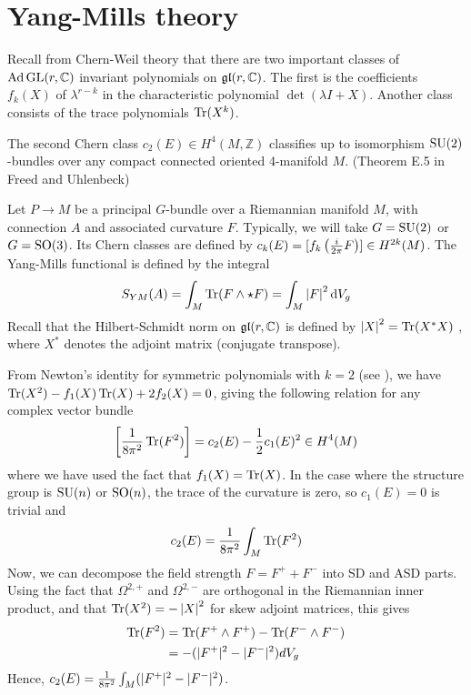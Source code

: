 \section{Yang-Mills theory}
Recall from Chern-Weil theory that there are two important classes of
$\operatorname{Ad} \operatorname{GL}(r,\mathbb{C})$ invariant polynomials on $\operatorname{\mathfrak{gl}}(r,\mathbb{C})$. 
The first is the coefficients $f_k(X)$ of $\lambda^{r-k}$ in the characteristic
polynomial $\det(\lambda I + X)$. Another class consists of the trace
polynomials $\operatorname{Tr}(X^k)$. 
\begin{thm}
	The second Chern class $c_2(E)\in H^4(M,\mathbb{Z})$ classifies up to
	isomorphism $\operatorname{SU}(2)$-bundles over any compact connected oriented 4-manifold
	 $M$. (Theorem E.5 in Freed and Uhlenbeck)
\end{thm}

Let $P\to M$ be a principal $G$-bundle over a Riemannian manifold $M$, with 
connection $A$ and associated curvature  $F$. Typically, we will take $G=\operatorname{SU}(2)$
or $G=\operatorname{SO}(3)$.
Its Chern classes are defined by $c_k(E) =
[f_k\paren{\frac{i}{2\pi}F}] \in H^{2k}(M)$. 
The Yang-Mills functional is defined by the integral
\[
	S_{YM}(A) = \int_M \Tr (F\wedge \star F) = \int_M \abs{F}^2 \odif{V}_g
\] 
Recall that the Hilbert-Schmidt norm on $\operatorname{\mathfrak{gl}}(r,\mathbb{C})$ is defined by 
$\abs{X}^2 = \Tr(X^* X)$ , where $X^*$ denotes the adjoint matrix (conjugate 
transpose). 

From Newton's identity for symmetric polynomials with $k=2$ 
(see \cite[Theorem B.2]{loringtu}), we have $\operatorname{Tr}(X^2)-f_1(X)\operatorname{Tr}(X)+2f_2(X)=0$, 
giving the following relation for any complex vector bundle
\[ %
	\bracket{\frac{1}{8\pi^2} \Tr(F^2)} = c_2(E) - \frac{1}{2}c_1(E)^2 \in H^4(M)
\] 
where we have used the fact that $f_1(X)=\operatorname{Tr}(X)$. 
In the case where the structure group is $\operatorname{SU}(n)$ or $\operatorname{SO}(n)$, the trace of the
curvature is zero, so $c_1(E)=0$ is trivial and 
\[
c_2(E) = \frac{1}{8\pi^2}\int_M \operatorname{Tr}(F^2)
\] 
Now, we can
decompose the field strength $F = F^+ + F^-$ into SD and ASD 
parts. Using the fact that $\Omega^{2,+}$ and $\Omega^{2,-}$ are orthogonal in
the Riemannian inner product, and
that $\Tr(X^2) = -\abs{X}^2$ for skew adjoint matrices, this 
gives 
\begin{align*}
\Tr(F^2) 
&= \Tr(F^{+}\wedge  F^{+}) - \Tr(F^{-}\wedge F^{-}) \\
&= - (\abs[*]{F^+}^2 - \abs[*]{F^-}^2) dV_g 
\end{align*}
Hence, $c_2(E) = \frac{1}{8\pi^2}\int_M
(\abs[*]{F^+}^2-\abs[*]{F^-}^2)$. 

